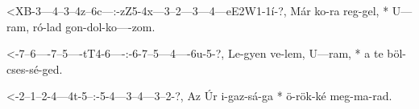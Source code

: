 

  {<XB-3---4--3--4z--6c---:-zZ5-4x---3--2---3---4---eE2W1-1í-?,}
  {    Már ko-ra reg-gel, * U---ram, ró-lad gon-dol-ko----zom.}

  {<-7--6----7--5----tT4-6----:-6-7--5---4----6u-5-?,}
  {  Le-gyen ve-lem, U---ram, * a te böl-cses-sé-ged.}

  {<-2--1--2-4---4t-5--:-5-4---3--4---3--2-?,}
  {  Az Úr i-gaz-sá-ga * ö-rök-ké meg-ma-rad.}